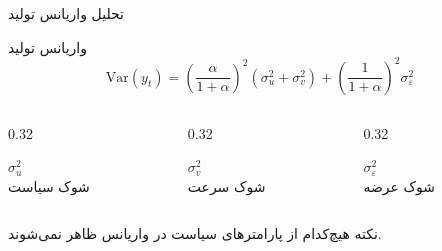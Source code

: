 \documentclass[aspectratio=169,11pt]{beamer}
\begin{document}
\begin{frame}{تحلیل واریانس تولید}
  \begin{block}{واریانس تولید}
    \[
      \text{Var}(y_t) = \left(\frac{\alpha}{1+\alpha}\right)^2 (\sigma_u^2 + \sigma_v^2) + \left(\frac{1}{1+\alpha}\right)^2 \sigma_\varepsilon^2
    \]
  \end{block}
  \vspace{0.3cm}
  \begin{LTR}
  \begin{columns}[T]
    \begin{column}{0.32\textwidth}
      \begin{RTL}
      \centering
      $\sigma_u^2$\\[0.2cm]
      \small شوک سیاست
      \end{RTL}
    \end{column}
    \hfill
    \begin{column}{0.32\textwidth}
      \begin{RTL}
      \centering
      $\sigma_v^2$\\[0.2cm]
      \small شوک سرعت
      \end{RTL}
    \end{column}
    \hfill
    \begin{column}{0.32\textwidth}
      \begin{RTL}
      \centering
      $\sigma_\varepsilon^2$\\[0.2cm]
      \small شوک عرضه
      \end{RTL}
    \end{column}
  \end{columns}
  \end{LTR}
  \vspace{0.3cm}
  \begin{alertblock}{نکته}
    هیچ‌کدام از پارامترهای سیاست در واریانس ظاهر نمی‌شوند.
  \end{alertblock}
\end{frame}
\end{document}
